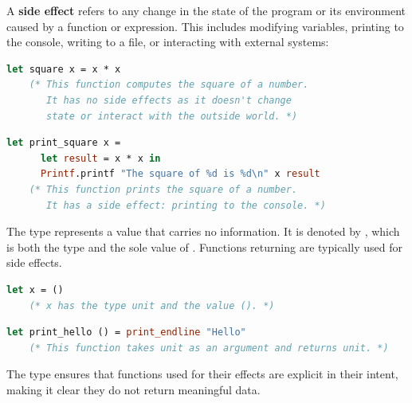 \newpage 


\begin{Def}

    A \textbf{side effect} refers to any change in the state of the program or its environment caused by a function or expression. 
    This includes modifying variables, printing to the console, writing to a file, or interacting with external systems:
    
    \begin{lstlisting}[language=OCaml, caption={Function Without a Side Effect}, numbers=none]
    let square x = x * x
    (* This function computes the square of a number.
       It has no side effects as it doesn't change 
       state or interact with the outside world. *)
    \end{lstlisting}
    
    \begin{lstlisting}[language=OCaml, caption={Function With a Side Effect}, numbers=none]
    let print_square x =
      let result = x * x in
      Printf.printf "The square of %d is %d\n" x result
    (* This function prints the square of a number.
       It has a side effect: printing to the console. *)
    \end{lstlisting}
    \end{Def}
    

\begin{Def}

The  type represents a value that carries no information. It is denoted by \snippet{()}, which is both the type and the sole value of . Functions returning  are typically used for side effects.

\begin{lstlisting}[language=OCaml, caption={Unit Type and Value}, numbers=none]
    let x = ()
    (* x has the type unit and the value (). *)
\end{lstlisting}

\begin{lstlisting}[language=OCaml, caption={Function Returning Unit}, numbers=none]
    let print_hello () = print_endline "Hello"
    (* This function takes unit as an argument and returns unit. *)
\end{lstlisting}

The  type ensures that functions used for their effects are explicit in their intent, making it clear they do not return meaningful data.
\end{Def}

